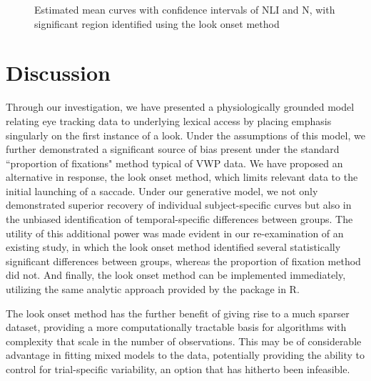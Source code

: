 \begin{figure}[H]
    \centering
    \caption{Estimated mean curves with confidence intervals of NLI and N, with significant region identified using the look onset method}
\label{fig:irldata2}
\end{figure}



\section{Discussion}



Through our investigation, we have presented a physiologically grounded model relating eye tracking data to underlying lexical access by placing emphasis singularly on the first instance of a look. Under the assumptions of this model, we further demonstrated a significant source of bias present under the standard ``proportion of fixations" method typical of VWP data. We have proposed an alternative in response, the look onset method, which limits relevant data to the initial launching of a saccade. Under our generative model, we not only demonstrated superior recovery of individual subject-specific curves but also in the unbiased identification of temporal-specific differences between groups. The utility of this additional power was made evident in our re-examination of an existing study, in which the look onset method identified several statistically significant differences between groups, whereas the proportion of fixation method did not. And finally, the look onset method can be implemented immediately, utilizing the same analytic approach provided by the  package in R.

The look onset method has the further benefit of giving rise to a much sparser dataset, providing a more computationally tractable basis for algorithms with complexity that scale in the number of observations. This may be of considerable advantage in fitting mixed models to the data, potentially providing the ability to control for trial-specific variability, an option that has hitherto been infeasible. 

